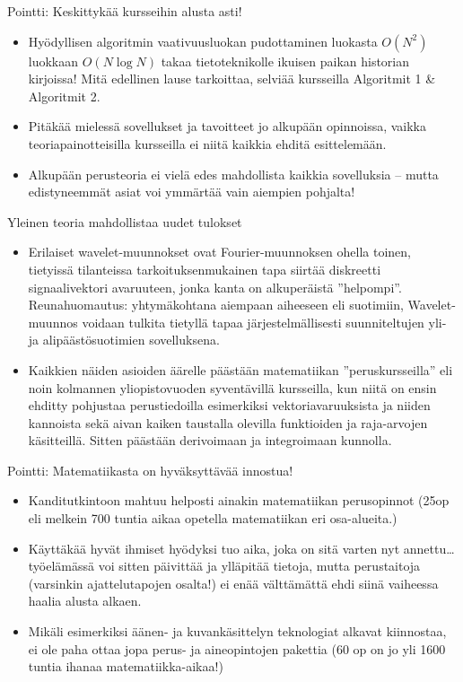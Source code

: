 \documentclass[pdf,9pt,handout]{beamer}
\begin{document}
\begin{frame}{Pointti: Keskittykää kursseihin alusta asti!}
\begin{itemize}
\item
  Hyödyllisen algoritmin vaativuusluokan pudottaminen luokasta
  $O(N^2)$ luokkaan $O(N \mathop{log} N)$ takaa tietoteknikolle
  ikuisen paikan historian kirjoissa! Mitä edellinen lause tarkoittaa,
  selviää kursseilla Algoritmit 1 \& Algoritmit 2.
\item
  Pitäkää mielessä sovellukset ja tavoitteet jo alkupään opinnoissa,
  vaikka teoriapainotteisilla kursseilla ei niitä kaikkia ehditä
  esittelemään.
\item Alkupään perusteoria ei vielä edes mahdollista kaikkia
  sovelluksia -- mutta edistyneemmät asiat voi ymmärtää vain aiempien
  pohjalta!
\end{itemize}
\end{frame}

\begin{frame}{Yleinen teoria mahdollistaa uudet tulokset}
\begin{itemize}
\item
  Erilaiset wavelet-muunnokset \cite{daubechies1990wavelet} ovat
  Fourier-muunnoksen ohella toinen, tietyissä tilanteissa
  tarkoituksenmukainen tapa siirtää diskreetti signaalivektori
  avaruuteen, jonka kanta on alkuperäistä
  ''helpompi''. Reunahuomautus: yhtymäkohtana aiempaan aiheeseen eli
  suotimiin, Wavelet-muunnos voidaan tulkita tietyllä tapaa
  järjestelmällisesti suunniteltujen yli- ja alipäästösuotimien
  sovelluksena.
\item
  Kaikkien näiden asioiden äärelle päästään matematiikan
  ''peruskursseilla'' eli noin kolmannen yliopistovuoden syventävillä
  kursseilla, kun niitä on ensin ehditty pohjustaa perustiedoilla
  esimerkiksi vektoriavaruuksista ja niiden kannoista sekä aivan
  kaiken taustalla olevilla funktioiden ja raja-arvojen käsitteillä.
  Sitten päästään derivoimaan ja integroimaan kunnolla.
\end{itemize}
\end{frame}

\begin{frame}{Pointti: Matematiikasta on hyväksyttävää innostua!}

\begin{itemize}
\item
  Kanditutkintoon mahtuu helposti ainakin matematiikan perusopinnot
  (25op eli melkein 700 tuntia aikaa opetella matematiikan eri
  osa-alueita.)
\item
  Käyttäkää hyvät ihmiset hyödyksi tuo aika, joka on sitä varten nyt
  annettu\ldots työelämässä voi sitten päivittää ja ylläpitää tietoja,
  mutta perustaitoja (varsinkin ajattelutapojen osalta!) ei enää
  välttämättä ehdi siinä vaiheessa haalia alusta alkaen.
\item
  Mikäli esimerkiksi äänen- ja kuvankäsittelyn teknologiat alkavat
  kiinnostaa, ei ole paha ottaa jopa perus- ja aineopintojen
  pakettia (60 op on jo yli 1600 tuntia ihanaa matematiikka-aikaa!)
\end{itemize}
\end{frame}
\end{document}
